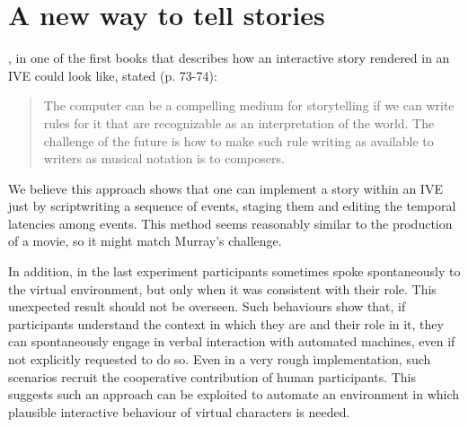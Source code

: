 \documentclass[
		twoside,openright,titlepage,numbers=noenddot,manychapters,
		headinclude,%
                footinclude=false,cleardoublepage=empty,
                BCOR=5mm,
		fontsize=11pt, %
                 enabledeprecatedfontcommands]{scrreprt}
\begin{document}
 



\section{A new way to tell stories}
\cite{Murray1997}, in one of the first books that describes how an interactive story rendered in an IVE could look like, stated  (p. 73-74): 
\begin{quote}
The computer can be a compelling medium for storytelling if we can write rules for it that are recognizable as an interpretation of the world. The challenge of the future is how to make such rule writing as available to writers as musical notation is to composers. 
\end{quote}
We believe this approach shows that one can implement a story within an IVE just by scriptwriting a sequence of events, staging them and editing the temporal latencies among events. This method seems reasonably similar to the production of a movie, so it might match Murray's challenge.

In addition, in the last experiment participants sometimes spoke spontaneously to the virtual environment, but only when it was consistent with their role. This unexpected result should not be overseen. Such behaviours show that, if participants understand the context in which they are and their role in it, they can spontaneously engage in verbal interaction with automated machines, even if not explicitly requested to do so. Even in a very rough implementation, such scenarios recruit the cooperative contribution of human participants. This suggests such an approach can be exploited to automate an environment in which plausible interactive behaviour of virtual characters is needed.
\end{document}
